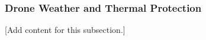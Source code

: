 
\subsubsection{Drone Weather and Thermal Protection}
\label{subsubsec:design_10_3_drone_weather_thermal}

[Add content for this subsection.]
